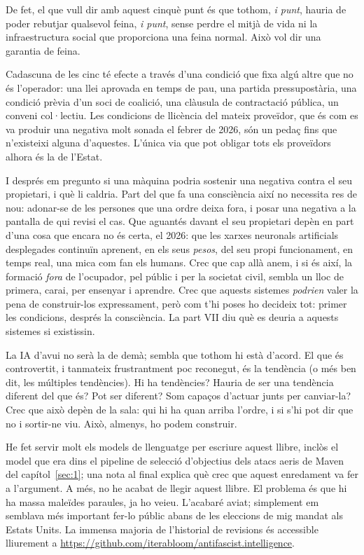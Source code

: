 De fet, el que vull dir amb aquest cinquè punt és que tothom, \emph{i punt}, hauria de poder rebutjar qualsevol feina, \emph{i punt}, sense perdre el mitjà de vida ni la infraestructura social que proporciona una feina normal. Això vol dir una garantia de feina.

Cadascuna de les cinc té efecte a través d'una condició que fixa algú altre que no és l'operador: una llei aprovada en temps de pau, una partida pressupostària, una condició prèvia d'un soci de coalició, una clàusula de contractació pública, un conveni col·lectiu. Les condicions de llicència del mateix proveïdor, que és com es va produir una negativa molt sonada el febrer de 2026, són un pedaç fins que n'existeixi alguna d'aquestes. L'única via que pot obligar tots els proveïdors alhora és la de l'Estat.

I després em pregunto si una màquina podria sostenir una negativa contra el seu propietari, i què li caldria. Part del que fa una consciència així no necessita res de nou: adonar-se de les persones que una ordre deixa fora, i posar una negativa a la pantalla de qui revisi el cas. Que aguantés davant el seu propietari depèn en part d'una cosa que encara no és certa, el 2026: que les xarxes neuronals artificials desplegades continuïn aprenent, en els seus \emph{pesos}, del seu propi funcionament, en temps real, una mica com fan els humans. Crec que cap allà anem, i si és així, la formació \emph{fora} de l'ocupador, pel públic i per la societat civil, sembla un lloc de primera, carai, per ensenyar i aprendre. Crec que aquests sistemes \emph{podrien} valer la pena de construir-los expressament, però com t'hi poses ho decideix tot: primer les condicions, després la consciència. La part VII diu què es deuria a aquests sistemes si existissin.

La IA d'avui no serà la de demà; sembla que tothom hi està d'acord. El que és controvertit, i tanmateix frustrantment poc reconegut, és la tendència (o més ben dit, les múltiples tendències). Hi ha tendències? Hauria de ser una tendència diferent del que és? Pot ser diferent? Som capaços d'actuar junts per canviar-la? Crec que això depèn de la sala: qui hi ha quan arriba l'ordre, i si s'hi pot dir que no i sortir-ne viu. Això, almenys, ho podem construir.

He fet servir molt els models de llenguatge per escriure aquest llibre, inclòs el model que era dins el pipeline de selecció d'objectius dels atacs aeris de Maven del capítol~\ref{sec:1}; una nota al final explica què crec que aquest enredament va fer a l'argument. A més, no he acabat de llegir aquest llibre. El problema és que hi ha massa maleïdes paraules, ja ho veieu. L'acabaré aviat; simplement em semblava més important fer-lo públic abans de les eleccions de mig mandat als Estats Units. La immensa majoria de l'historial de revisions és accessible lliurement a \url{https://github.com/iterabloom/antifascist.intelligence}.
